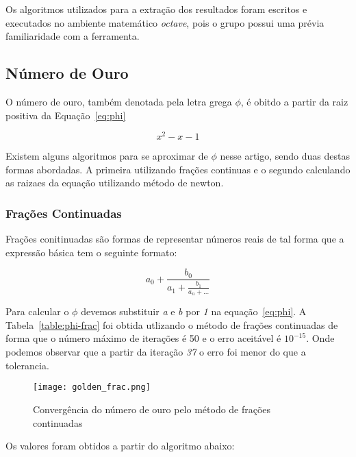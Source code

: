 	Os algoritmos utilizados para a extração dos resultados foram escritos e
	executados no ambiente matemático \emph{octave}, pois o grupo possui uma
	prévia familiaridade com a ferramenta. 
	
	\subsection{Número de Ouro}
		
		O número de ouro, também denotada pela letra grega $\phi$, é obitdo a
		partir da raiz positiva da Equação~\ref{eq:phi}

		\begin{equation}
			x^2-x-1
		\label{eq:phi}
		\end{equation}

		Existem alguns algoritmos para se aproximar de $\phi$ nesse artigo,
		sendo duas destas formas  abordadas. A primeira utilizando frações
		continuas e o segundo calculando as raizaes da equação utilizando método
		de newton.

		\subsubsection{Frações Continuadas}

			Frações conitinuadas são formas de representar números reais de tal
			forma que a expressão básica tem o seguinte formato:

			\begin{equation}
			\label{eq:phi-frac}
				a_0 + \frac{b_0}{a_1 + \frac{b_1}{a_n + \dots}}
			\end{equation}

			Para calcular o $\phi$ devemos substituir \emph{a} e \emph{b} por
			\emph{1} na equação~\ref{eq:phi}. A Tabela~\ref{table:phi-frac} foi
			obtida utlizando o método de frações continuadas de forma que o
			número máximo de iterações é 50 e o erro aceitável é $10^{-15}$. Onde
			podemos observar que a partir da iteração \emph{37} o erro foi
			menor do que a tolerancia.

			


			\begin{figure}[H]
				\centering
				\texttt{[image: golden\_frac.png]}
				\caption{Convergência do número de ouro pelo método de frações continuadas}
				\label{golden_frac}
			\end{figure}


			Os valores foram obtidos a partir do algoritmo abaixo:

